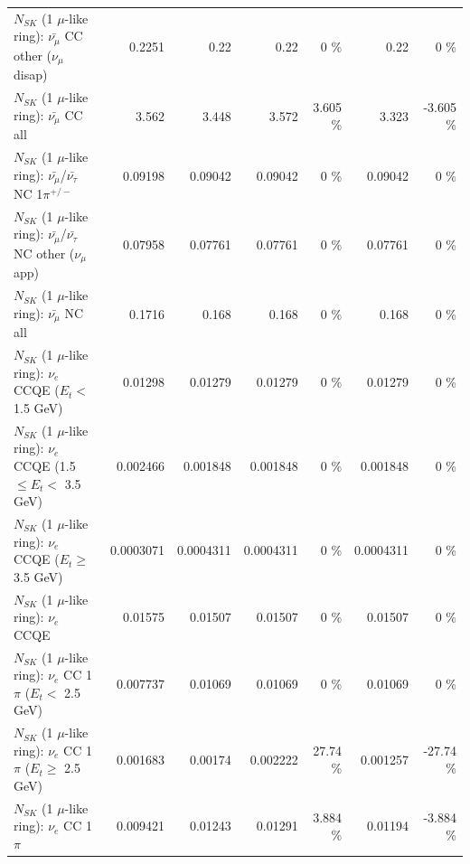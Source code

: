 \begin{table}
\begin{tabular}{| l | r | r | r  r | r  r |}
        $N_{SK}$ (1 $\mu$-like ring): $\bar{\nu_\mu}$ CC other ($\nu_\mu$ disap) &          0.2251 &            0.22 &            0.22 &        0 \%  &            0.22 &        0 \%  \\ 
                          $N_{SK}$ (1 $\mu$-like ring): $\bar{\nu_{\mu}}$ CC all &           3.562 &           3.448 &           3.572 &    3.605 \%  &           3.323 &   -3.605 \%  \\ 
\hline
  $N_{SK}$ (1 $\mu$-like ring): $\bar{\nu_\mu}$/$\bar{\nu_\tau}$ NC 1$\pi^{+/-}$ &         0.09198 &         0.09042 &         0.09042 &        0 \%  &         0.09042 &        0 \%  \\ 
$N_{SK}$ (1 $\mu$-like ring): $\bar{\nu_\mu}$/$\bar{\nu_\tau}$ NC other ($\nu_\mu$ app) &         0.07958 &         0.07761 &         0.07761 &        0 \%  &         0.07761 &        0 \%  \\ 
                          $N_{SK}$ (1 $\mu$-like ring): $\bar{\nu_{\mu}}$ NC all &          0.1716 &           0.168 &           0.168 &        0 \%  &           0.168 &        0 \%  \\ 
\hline
\hline
\hline
                  $N_{SK}$ (1 $\mu$-like ring): $\nu_e$ CCQE ($E_{t} <$ 1.5 GeV) &         0.01298 &         0.01279 &         0.01279 &        0 \%  &         0.01279 &        0 \%  \\ 
         $N_{SK}$ (1 $\mu$-like ring): $\nu_e$ CCQE (1.5 $\leq E_{t} <$ 3.5 GeV) &        0.002466 &        0.001848 &        0.001848 &        0 \%  &        0.001848 &        0 \%  \\ 
               $N_{SK}$ (1 $\mu$-like ring): $\nu_e$ CCQE ($E_{t} \geq$ 3.5 GeV) &       0.0003071 &       0.0004311 &       0.0004311 &        0 \%  &       0.0004311 &        0 \%  \\ 
\hline
                                      $N_{SK}$ (1 $\mu$-like ring): $\nu_e$ CCQE &         0.01575 &         0.01507 &         0.01507 &        0 \%  &         0.01507 &        0 \%  \\ 
\hline
             $N_{SK}$ (1 $\mu$-like ring): $\nu_e$ CC 1$\pi$ ($E_{t} <$ 2.5 GeV) &        0.007737 &         0.01069 &         0.01069 &        0 \%  &         0.01069 &        0 \%  \\ 
          $N_{SK}$ (1 $\mu$-like ring): $\nu_e$ CC 1$\pi$ ($E_{t} \geq$ 2.5 GeV) &        0.001683 &         0.00174 &        0.002222 &    27.74 \%  &        0.001257 &   -27.74 \%  \\ 
\hline
                                 $N_{SK}$ (1 $\mu$-like ring): $\nu_e$ CC 1$\pi$ &        0.009421 &         0.01243 &         0.01291 &    3.884 \%  &         0.01194 &   -3.884 \%  \\ 

\end{tabular}
\end{table}
